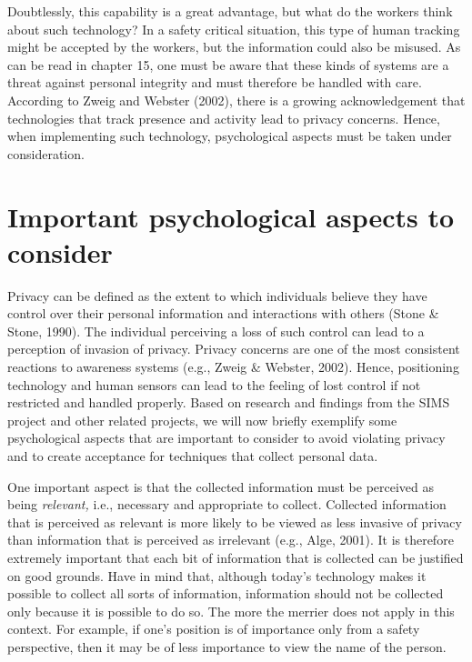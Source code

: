\documentclass[
  12pt,
]{scrbook}
\begin{document}
Doubtlessly, this capability is a great advantage, but what do the workers think about such technology? In a safety critical situation, this type of human tracking might be accepted by the workers, but the information could also be misused. As can be read in chapter 15, one must be aware that these kinds of systems are a threat against personal integrity and must therefore be handled with care. According to Zweig and Webster (2002), there is a growing acknowledgement that technologies that track presence and activity lead to privacy concerns. Hence, when implementing such technology, psychological aspects must be taken under consideration.

\hypertarget{important-psychological-aspects-to-consider}{%
\section*{Important psychological aspects to consider}\label{important-psychological-aspects-to-consider}}

Privacy can be defined as the extent to which individuals believe they have control over their personal information and interactions with others (Stone \& Stone, 1990). The individual perceiving a loss of such control can lead to a perception of invasion of privacy. Privacy concerns are one of the most consistent reactions to awareness systems (e.g., Zweig \& Webster, 2002). Hence, positioning technology and human sensors can lead to the feeling of lost control if not restricted and handled properly. Based on research and findings from the SIMS project and other related projects, we will now briefly exemplify some psychological aspects that are important to consider to avoid violating privacy and to create acceptance for techniques that collect personal data.

One important aspect is that the collected information must be perceived as being \emph{relevant,} i.e., necessary and appropriate to collect. Collected information that is perceived as relevant is more likely to be viewed as less invasive of privacy than information that is perceived as irrelevant (e.g., Alge, 2001). It is therefore extremely important that each bit of information that is collected can be justified on good grounds. Have in mind that, although today's technology makes it possible to collect all sorts of information, information should not be collected only because it is possible to do so. The more the merrier does not apply in this context. For example, if one's position is of importance only from a safety perspective, then it may be of less importance to view the name of the person.~
\end{document}
